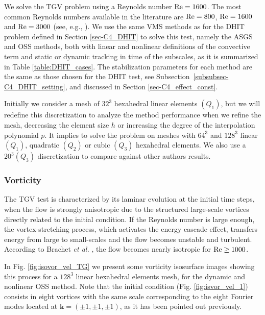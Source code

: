 We solve the TGV problem using a Reynolds number ${\rm Re}=1600$. 
The most common Reynolds numbers available in the literature are ${\rm Re}=800$, ${\rm Re}=1600$ and ${\rm Re}=3000$ (see, e.g., \cite{andrea_d._beck_numerical_2012, fauconnier_construction_2009, gassner_accuracy_????, jb_chapelier_final_2012}).
We use the same VMS methods as for the DHIT problem defined in Section \ref{sec-C4_DHIT} to solve this test, namely the ASGS and OSS methods, both with linear and nonlinear definitions of the convective term and static or dynamic tracking in time of the subscales, as it is summarized in Table \ref{table:DHIT_cases}.
The stabilization parameters for each method are the same as those chosen for the DHIT test, see Subsection~\ref{subsubsec-C4_DHIT_setting}, and discussed in Section \ref{sec-C4_effect_const}.

Initially we consider a mesh of $32^3$ hexahedral linear elements $(Q_1)$, but we will redefine this discretization to analyze the method performance when we refine the mesh, decreasing the element size $h$ or increasing the degree of the interpolation polynomial $p$. It implies to solve the problem on meshes with $64^3$ and $128^3$ linear $(Q_1)$, quadratic $(Q_2)$ or cubic $(Q_3)$ hexahedral elements. We also use a $20^3(Q_3)$ discretization to compare against other authors results.

\subsubsection{Vorticity}
The TGV test is characterized by its laminar evolution at the initial time steps, when the flow is strongly anisotropic due to the structured large-scale vortices directly related to the initial condition. If the Reynolds number is large enough, the vortex-stretching process, which activates the energy cascade effect, transfers energy from large to small-scales and the flow becomes unstable and turbulent. According to Brachet \emph{et al.} \cite{brachet_small-scale_1983}, the flow becomes nearly isotropic for ${\rm Re}\geq1000$.

In Fig. \ref{fig:isovor_vel_TG} we present some vorticity isosurface images showing this process for  a $128^3$ linear hexahedral elements mesh, for the dynamic and nonlinear OSS method. Note that the initial condition (Fig. \ref{fig:isvor_vel_1}) consists in eight vortices with the same scale corresponding to the eight Fourier modes located at $\mathbf{k}=(\pm1,\pm1,\pm1)$, as it has been pointed out previously.

